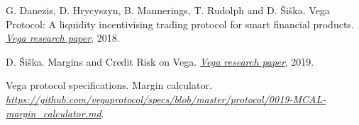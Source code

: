 \documentclass[10pt]{article}
\begin{document}
\begin{thebibliography}{10}
G. Danezis, D. Hrycyszyn, B. Mannerings, T. Rudolph and D. \v{S}i\v{s}ka. Vega Protocol: A liquidity incentivising trading protocol for smart financial products. {\em \href{https://vega.xyz/papers/}{Vega research paper}}, 2018.

D. \v{S}i\v{s}ka. Margins and Credit Risk on Vega. {\em \href{https://vega.xyz/papers/}{Vega research paper}}, 2019.

Vega protocol specifications. Margin calculator.\\ {\em \href{https://github.com/vegaprotocol/specs/blob/master/protocol/0019-MCAL-margin_calculator.md}{https://github.com/vegaprotocol/specs/blob/master/protocol/0019-MCAL-margin\_calculator.md}}.


%











\end{thebibliography}
\end{document}
